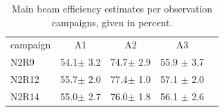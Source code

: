 \begin{table}[!ht]
\caption{Main beam efficiency estimates per observation campaigns,
given in percent.}
\label{tab:MB}
\centering
\begin{tabular}{lcccc}
\hline\hline
\noalign{\smallskip}
campaign &  A1    &    A2   &  A3    \\
\noalign{\smallskip}
\hline
\noalign{\smallskip}
N2R9    &  54.1$\pm$ 3.2   &  74.7$\pm$ 2.9  & 55.9 $\pm$ 3.7      \\
N2R12   &  55.7$\pm$ 2.0   &  77.4$\pm$ 1.0  & 57.1 $\pm$ 2.0      \\
N2R14   &  55.0$\pm$ 2.7   &  76.0$\pm$ 1.8  & 56.1 $\pm$ 2.6     \\
            \hline
\end{tabular}
\end{table}


